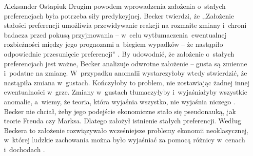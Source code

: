 \begin{artplenv}{Aleksander Ostapiuk}
Drugim powodem wprowadzenia założenia o~stałych preferencjach była potrzeba siły predykcyjnej. Becker twierdzi, że
,,Założenie stałości preferencji umożliwia przewidywanie reakcji na rozmaite zmiany i~chroni badacza przed pokusą
przyjmowania -- w~celu \guillemotleft wytłumaczenia\guillemotright\ 
ewentualnej rozbieżności między jego prognozami a~biegiem wypadków -- że
nastąpiło odpowiednie przesunięcie preferencji''
\parencite[s.~23]{becker_ekonomiczna_1990}.
By udowodnić, że
założenie o~stałych preferencjach jest ważne, Becker analizuje odwrotne założenie -- gusta są zmienne i~podatne na
zmianę. W~przypadku anomalii wystarczyłoby wtedy stwierdzić, że nastąpiła zmiana w~gustach. Kończyłoby to problem, nie
zostawiając żadnej innej ewentualności w~grze. Zmiany w~gustach tłumaczyłyby i~wyjaśniałyby wszystkie anomalie, a~wiemy,
że teoria, która wyjaśnia wszystko, nie wyjaśnia niczego
\parencite{popper_logic_1959}.
Becker nie chciał,
żeby jego podejście ekonomiczne stało się pseudonauką, jak teorie Freuda czy Marksa. Dlatego założył istnienie stałych
preferencji. Według Beckera to założenie rozwiązywało wcześniejsze problemy ekonomii neoklasycznej, w~której ludzkie zachowania
można było wyjaśniać za pomocą różnicy w~cenach i~dochodach
\parencite{becker_gustibus_1977}.


\end{artplenv}
